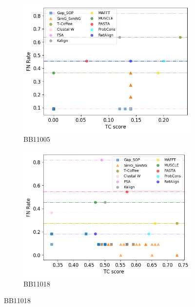 \begin{figure}[!htbp]
	\begin{adjustwidth}{-1cm}{-1cm}
	\centering
		\begin{subfigure}{0.22\textwidth}
			\includegraphics[width=\columnwidth]{Figure/summary/precomputedInit/Balibase/BB11005_fnrate_vs_tc_2}
			\caption{BB11005}
		\end{subfigure}	
		\begin{subfigure}{0.22\textwidth}
			\includegraphics[width=\columnwidth]{Figure/summary/precomputedInit/Balibase/BB11018_fnrate_vs_tc_2}
			\caption{BB11018}
		\end{subfigure}

\end{adjustwidth}
\end{figure}
